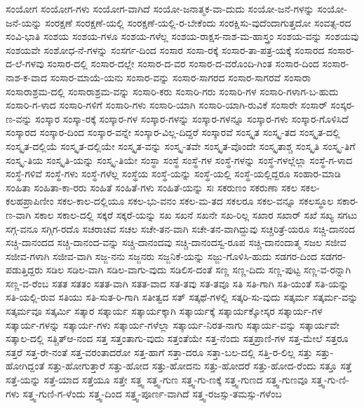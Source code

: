 {ಸಂಯೋಗ
ಸಂಯೋಗ-ಗಳು
ಸಂಯೋಗ-ವಾಗಿದೆ
ಸಂಯೋ-ಜನಾತ್ಮಕ-ವಾ-ದುದು
ಸಂಯೋ-ಜನೆ-ಗಳನ್ನು
ಸಂಯೋ-ಜನೆ-ಯನ್ನು
ಸಂರಕ್ಷಣೆ
ಸಂರಕ್ಷಣೆ-ಯಲ್ಲಿ
ಸಂರಕ್ಷಣೆ-ಯಲ್ಲಿ-ರ-ಬೇಕೆಂದು
ಸಂರಕ್ಷಿಸು-ವುದೆಂದಾಗುತ್ತದೋ
ಸಂವತ್ಸ-ರದ
ಸಂವಿ-ಭಾತಿ
ಸಂಶಯ
ಸಂಶಯ-ಗಳೂ
ಸಂಶಯ-ಗಳೆಲ್ಲ
ಸಂಶಯ-ರಾಕ್ಷಸ-ನಾಶ-ಮ-ಹಾಸ್ತ್ರಂ
ಸಂಶಯ-ವನ್ನು
ಸಂಶಯವು
ಸಂಶಯವೇ
ಸಂಶೋಧ-ನೆ-ಗಳನ್ನು
ಸಂಸರ್ಗ-ದಿಂದ
ಸಂಸಾರ
ಸಂಸಾ-ರಕ್ಕೆ
ಸಂಸಾರ-ತಾ-ಪತ್ರ-ಯಕ್ಕೆ
ಸಂಸಾರದ
ಸಂಸಾರ-ದ-ಲೆ-ಗಳವು
ಸಂಸಾರ-ದಲ್ಲಿ
ಸಂಸಾರ-ದಲ್ಲೇ
ಸಂಸಾರ-ದ-ವರ
ಸಂಸಾರ-ದ-ವರೊಂದಿ-ಗಿಂತ
ಸಂಸಾರ-ದಿಂದ
ಸಂಸಾರ-ನಾಶ-ಕ-ವಾದ
ಸಂಸಾರ-ಮಾಯೆ-ಯನು
ಸಂಸಾರ-ವನ್ನು
ಸಂಸಾರ-ಸಾಗರದ
ಸಂಸಾರ-ಸಾಗರವೆ
ಸಂಸಾರಾ
ಸಂಸಾರಾಶ್ರಮ-ದಲ್ಲಿ
ಸಂಸಾರಾಶ್ರಮ-ವನ್ನು
ಸಂಸಾರಿ-ಕರು
ಸಂಸಾರಿ-ಗರು
ಸಂಸಾರಿ-ಗಳ
ಸಂಸಾರಿ-ಗಳಾಗ-ಬ-ಹುದು
ಸಂಸಾರಿ-ಗ-ಳಾದ
ಸಂಸಾರಿ-ಗಳಿಗೆ
ಸಂಸಾರಿ-ಗಳು
ಸಂಸಾರಿ-ಯಾಗಿ
ಸಂಸಾರಿ-ಯಾಗಿ-ರುವಿಕೆ
ಸಂಸಾರೇ
ಸಂಸಾರ್
ಸಂಸ್ಕರ-ಣ-ವನ್ನು
ಸಂಸ್ಕಾರ
ಸಂಸ್ಕಾ-ರಕ್ಕೆ
ಸಂಸ್ಕಾರ-ಗಳ
ಸಂಸ್ಕಾರ-ಗಳನ್ನು
ಸಂಸ್ಕಾರ-ಗಳನ್ನೂ
ಸಂಸ್ಕಾರ-ಗಳು
ಸಂಸ್ಕಾರ-ಗೊಳಿಸಿದೆ
ಸಂಸ್ಕಾರದ
ಸಂಸ್ಕಾರ-ದಿಂದ
ಸಂಸ್ಕಾರ-ವನ್ನೇ
ಸಂಸ್ಕಾರ-ವಿಲ್ಲ-ದಿದ್ದರೆ
ಸಂಸ್ಕಾರವೆ
ಸಂಸ್ಕೃತ
ಸಂಸ್ಕೃ-ತದ
ಸಂಸ್ಕೃತ-ದಲ್ಲಿ
ಸಂಸ್ಕೃತ-ದಲ್ಲಿಯೆ
ಸಂಸ್ಕೃತ-ದಲ್ಲಿಯೇ
ಸಂಸ್ಕೃತ-ವನ್ನು
ಸಂಸ್ಕೃ-ತವೇ
ಸಂಸ್ಕೃತ-ವೊಂದೇ
ಸಂಸ್ಕೃತಾಶ್ಚ
ಸಂಸ್ಕೃತಿ
ಸಂಸ್ಕೃ-ತಿಗೆ
ಸಂಸ್ಕೃ-ತಿಯ
ಸಂಸ್ಕೃತಿ-ಯನ್ನು
ಸಂಸ್ಕೃ-ತಿಯೇ
ಸಂಸ್ಥಾ
ಸಂಸ್ಥೆ
ಸಂಸ್ಥೆ-ಗಳ
ಸಂಸ್ಥೆ-ಗಳನ್ನು
ಸಂಸ್ಥೆ-ಗಳಲ್ಲೆಲ್ಲಾ
ಸಂಸ್ಥೆ-ಗ-ಳಾದ
ಸಂಸ್ಥೆ-ಗಳಿವೆ
ಸಂಸ್ಥೆ-ಗಳು
ಸಂಸ್ಥೆ-ಗಳೆಲ್ಲ
ಸಂಸ್ಥೆಯ
ಸಂಸ್ಥೆ-ಯನ್ನು
ಸಂಸ್ಥೆ-ಯಲ್ಲಿ
ಸಂಸ್ಥೆ-ಯಲ್ಲಿದ್ದರೂ
ಸಂಹಾರ-ಮಾಡಿ
ಸಂಹಿತಾ
ಸಂಹಿತಾ-ಕಾ-ರರು
ಸಂಹಿತೆ
ಸಂಹಿತೆ-ಗಳು
ಸಂಹಿತೆ-ಯನ್ನು
ಸಃ
ಸಕರುಣಂ
ಸಕರುಣಾ
ಸಕಲ
ಸಕಲ-ಕಲಹಪ್ರಾಪಿಣೀಂ
ಸಕಲ-ಕಾಲ-ದಲ್ಲಿಯೂ
ಸಕಲ-ಭು-ವನಂ
ಸಕಲ-ಮ-ತದ
ಸಕಲರೂ
ಸಕಲ-ವನ್ನೂ
ಸಕಲಸ್ಥೂಲ
ಸಕಾರ-ಣ-ವಾಗಿ
ಸಕಾಲ
ಸಕಾಲ-ದಲ್ಲಿ
ಸಕ್ಕರೆ
ಸಕ್ಕರೆ-ಯನ್ನು
ಸಖ
ಸಖನೆ
ಸಖನೇ
ಸಖ-ರಿಲ್ಲ
ಸಖಾರ
ಸಖಾರ್
ಸಖೆ
ಸಖ್ಯ
ಸಗಟು
ಸಗ್ಗ-ವನೂ
ಸಗ್ಗಿಗ-ರದೊ
ಸಚರಾಚವ
ಸಚಲ
ಸಚೇ-ತನ-ವಾಗಿ
ಸಚೇ-ತನ-ವಾಗಿದ್ದುವು
ಸಚ್ಚರಿತ್ರೆ-ಯರೂ
ಸಚ್ಚಿ-ದಾನಂದ
ಸಚ್ಚಿ-ದಾನಂದದ
ಸಚ್ಚಿ-ದಾನಂದ-ವನ್ನು
ಸಚ್ಚಿ-ದಾನಂದವು
ಸಚ್ಚಿ-ದಾನಂದಸ್ವ-ರೂಪ
ಸಚ್ಚಿ-ದಾನಂದಾತ್ಮ
ಸಜಲ
ಸಜೀವ
ಸಜೀವ-ಗಳಾಗಿ
ಸಜೀವ-ವಾಗಿ
ಸಜ್ಜ-ನನು
ಸಜ್ಜನರು
ಸಜ್ಜನಿಕೆ-ಯನ್ನು
ಸಜ್ಜು-ಗೊಳಿಸಿ-ಹುದು
ಸಡಗರ-ದಿಂದ
ಸಡಗರ-ಪಡುತ್ತಿದ್ದರು
ಸಡಿಲ
ಸಡಿಲ-ವಾಗಿ
ಸಡಿಲ-ವಾಗು-ವುದು
ಸಡಿಲಿಸ-ದಂತೆ
ಸಣ್ಣ
ಸಣ್ಣ-ದಿದು
ಸಣ್ಣ-ಪುಟ್ಟ
ಸಣ್ಣ-ವ-ರನ್ನಾಗಿ
ಸಣ್ಣ-ವ-ರೆಂಬ
ಸತತ
ಸತತಂ
ಸತತ-ವಾಗಿ
ಸತತ-ವಾದ
ಸತ-ತವು
ಸತ-ತವೂ
ಸತಿ
ಸತಿ-ಗಾಗಿ
ಸತಿ-ಯಂತೆ
ಸತಿ-ಯನ್ನು
ಸತಿ-ಯಲ್ಲಿ-ರುವ
ಸತಿಯು
ಸತಿ-ಸುತ-ರಿ-ಗಾಗಿ
ಸತೀತ್ವದ
ಸತ್
ಸತ್ಕಥೆ-ಗಳಲ್ಲಿ
ಸತ್ಕರಿ-ಸು-ವುದು
ಸತ್ಕರ್ಮ
ಸತ್ಕರ್ಮ-ವನ್ನು
ಸತ್ಕರ್ಮವೂ
ಸತ್ಕರ್ಮಿ
ಸತ್ಕಾರ
ಸತ್ಕಾರ್ಯ
ಸತ್ಕಾರ್ಯಕ್ಕಾಗಿ
ಸತ್ಕಾರ್ಯಕ್ಕೆ
ಸತ್ಕಾರ್ಯಕ್ಕೋಸ್ಕರ
ಸತ್ಕಾರ್ಯ-ಗಳ
ಸತ್ಕಾರ್ಯ-ಗಳನ್ನು
ಸತ್ಕಾರ್ಯ-ಗಳು
ಸತ್ಕಾರ್ಯ-ಗಳೆಲ್ಲಾ
ಸತ್ಕಾರ್ಯ-ನಿರತ-ನಾಗು
ಸತ್ಕಾರ್ಯ-ವನ್ನು
ಸತ್ಕಾರ್ಯವೇ
ಸತ್ಕಾಲ-ದಲ್ಲಿ
ಸತ್ಚಿತ್ಆ-ನಂದ
ಸತ್ತ
ಸತ್ತಂತಾಗು-ವುದು
ಸತ್ತಂತೆಯೇ
ಸತ್ತ-ನೆಂದು
ಸತ್ತಪ್ರಾಣಿ-ಗಳ
ಸತ್ತ-ಮೇಲೆ
ಸತ್ತರೂ
ಸತ್ತರೆ
ಸತ್ತ-ರೇ-ನಂತೆ
ಸತ್ತ-ವರಂತಾದರೋ
ಸತ್ತ-ಹಾಗೆ
ಸತ್ತಾ-ದರೂ
ಸತ್ತಾ-ಬಲ-ದಲ್ಲಿ
ಸತ್ತಿ-ರ-ಲಿಲ್ಲ
ಸತ್ತು
ಸತ್ತು-ಹೋಗಿದ್ದಂತೆ
ಸತ್ತು-ಹೋಗುತ್ತಾರೆ
ಸತ್ತು-ಹೋದ
ಸತ್ತು-ಹೋದನು
ಸತ್ತು-ಹೋದರೆ
ಸತ್ತು-ಹೋದ-ರೆಂದು
ಸತ್ತೂ
ಸತ್ತೆ
ಸತ್ತೆ-ಯನ್ನು
ಸತ್ತೆ-ಯಾದ
ಸತ್ತೆಯೂ
ಸತ್ತೇ
ಸತ್ತ್ವ
ಸತ್ತ್ವ-ಗುಣ
ಸತ್ತ್ವ-ಗು-ಣಕ್ಕೆ
ಸತ್ತ್ವ-ಗುಣದ
ಸತ್ತ್ವ-ಗುಣವೂ
ಸತ್ತ್ವ-ಗು-ಣಿ-ಗಳು
ಸತ್ತ್ವ-ಗುಣಿ-ಗ-ಳೆಂದು
ಸತ್ತ್ವ-ದಿಂದ
ಸತ್ತ್ವ-ಪೂರ್ಣ-ವಾಗಿದೆ
ಸತ್ತ್ವ-ರಜಸ್ಸು-ತಮಸ್ಸು-ಗಳೆಂಬ
}
